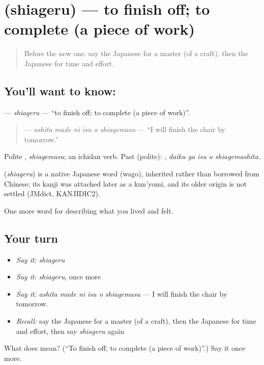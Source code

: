 \section[\texorpdfstring{\ja{しあげる} (shiageru)}{しあげる (shiageru)}]{ (shiageru) — to finish off; to complete (a piece of work)}

\label{lesson:JA-C480-shiageru}



\begin{quote}
Before the new one: say the Japanese for a master (of a craft), then the Japanese for time and effort.
\end{quote}

\subsection*{You'll want to know: }
\textbf{} — \emph{shiageru} — \textquotedblleft{}to finish off; to complete (a piece of work)\textquotedblright{}.

\begin{quote}
\textbf{  } — \emph{ashita made ni isu o shiagemasu} — \textquotedblleft{}I will finish the chair by tomorrow.\textquotedblright{}
\end{quote}

Polite \textbf{}, \emph{shiagemasu}; an ichidan verb. Past (polite): \textbf{  }, \emph{daiku ga isu o shiagemashita}.

\begin{cousinweb}
\textbf{} (\emph{shiageru}) is a native Japanese word (wago), inherited rather than borrowed from Chinese; its kanji was attached later as a kun'yomi, and its older origin is not settled (JMdict, KANJIDIC2).
\end{cousinweb}

\begin{grammarlens}[title={What you've built}]
One more word for describing what you lived and felt.
\end{grammarlens}

\subsection*{Your turn}
\begin{itemize}
\raggedright
  \item \emph{Say it:} \emph{shiageru}
  \item \emph{Say it:} \emph{shiageru}, once more
  \item \emph{Say it:} \emph{ashita made ni isu o shiagemasu} — I will finish the chair by tomorrow.
  \item \emph{Recall:} say the Japanese for a master (of a craft), then the Japanese for time and effort, then say \emph{shiageru} again
\end{itemize}

\begin{tcolorbox}[breakable,colback=teal!4,colframe=teal!35!black,title={Before you move on}]
What does  mean? (\textquotedblleft{}To finish off; to complete (a piece of work)\textquotedblright{}.) Say it once more.
\end{tcolorbox}
